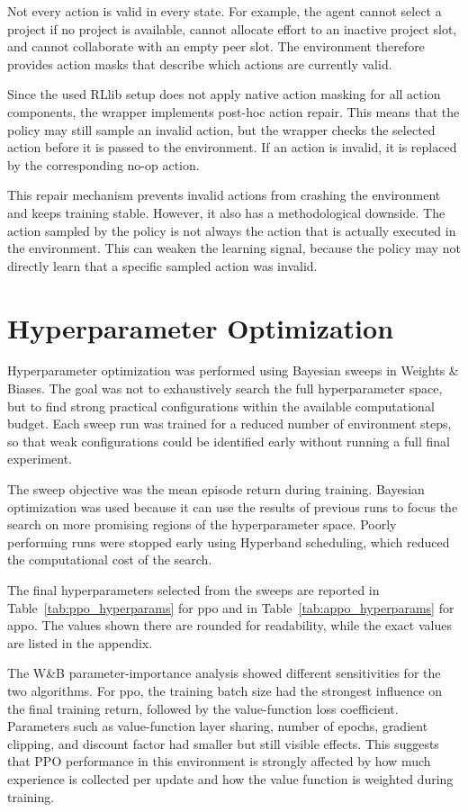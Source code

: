 \documentclass[english,bachelor]{hsluthesis}
\begin{document}
Not every action is valid in every state. For example, the agent cannot select a project if no project is available, cannot allocate effort to an inactive project slot, and cannot collaborate with an empty peer slot. The environment therefore provides action masks that describe which actions are currently valid.

Since the used RLlib setup does not apply native action masking for all action components, the wrapper implements post-hoc action repair. This means that the policy may still sample an invalid action, but the wrapper checks the selected action before it is passed to the environment. If an action is invalid, it is replaced by the corresponding no-op action.

This repair mechanism prevents invalid actions from crashing the environment and keeps training stable. However, it also has a methodological downside. The action sampled by the policy is not always the action that is actually executed in the environment. This can weaken the learning signal, because the policy may not directly learn that a specific sampled action was invalid.

\section{Hyperparameter Optimization}

Hyperparameter optimization was performed using Bayesian sweeps in Weights \& Biases. The goal was not to exhaustively search the full hyperparameter space, but to find strong practical configurations within the available computational budget. Each sweep run was trained for a reduced number of environment steps, so that weak configurations could be identified early without running a full final experiment.

The sweep objective was the mean episode return during training. Bayesian optimization was used because it can use the results of previous runs to focus the search on more promising regions of the hyperparameter space. Poorly performing runs were stopped early using Hyperband scheduling, which reduced the computational cost of the search.

The final hyperparameters selected from the sweeps are reported in Table~\ref{tab:ppo_hyperparams} for \gls{ppo} and in Table~\ref{tab:appo_hyperparams} for \gls{appo}. The values shown there are rounded for readability, while the exact values are listed in the appendix.

The W\&B parameter-importance analysis showed different sensitivities for the two algorithms. For \gls{ppo}, the training batch size had the strongest influence on the final training return, followed by the value-function loss coefficient. Parameters such as value-function layer sharing, number of epochs, gradient clipping, and discount factor had smaller but still visible effects. This suggests that PPO performance in this environment is strongly affected by how much experience is collected per update and how the value function is weighted during training.
\end{document}
